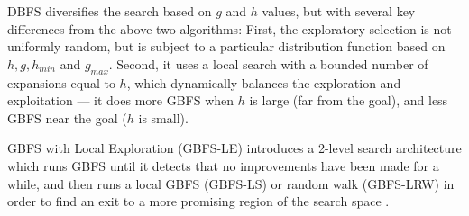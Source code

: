 DBFS \cite{imai2011novel} diversifies the
search based on $g$ and $h$ values, but with several key differences from
the above two algorithms: First, the exploratory selection is not uniformly
random, but is subject to a particular distribution function based on 
$h, g, h_{min}$ and $g_{max}$. Second, it uses a local search with
a bounded number of expansions equal to $h$, which dynamically balances the exploration
and exploitation --- it does more GBFS when $h$ is large (far
from the goal), and less GBFS near the goal ($h$ is small).

GBFS with Local Exploration (GBFS-LE) introduces a 2-level search architecture which runs
GBFS until it detects that no improvements have been made for a while, and
then runs a local GBFS (GBFS-LS) or random walk (GBFS-LRW)
in order to find an exit to a more promising region of the search space \cite{XieH14gbfsle}.

